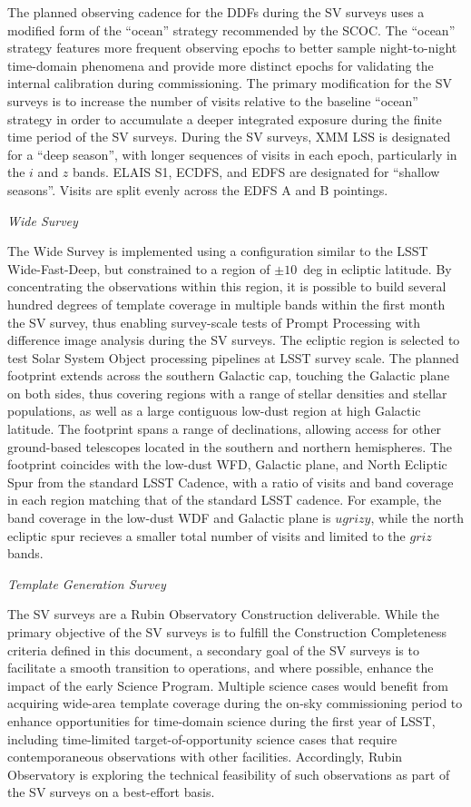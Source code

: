 The planned observing cadence for the DDFs during the SV surveys uses a modified form of the ``ocean'' strategy recommended by the SCOC.
The ``ocean'' strategy features more frequent observing epochs to better sample night-to-night time-domain phenomena and provide more distinct epochs for validating the internal calibration during commissioning.
The primary modification for the SV surveys is to increase the number of visits relative to the baseline ``ocean'' strategy in order to accumulate a deeper integrated exposure during the finite time period of the SV surveys.
During the SV surveys, XMM LSS is designated for a ``deep season'', with longer sequences of visits in each epoch, particularly in the $i$ and $z$ bands.
ELAIS S1, ECDFS, and EDFS are designated for ``shallow seasons''.
Visits are split evenly across the EDFS A and B pointings.

\textit{Wide Survey}

The Wide Survey is implemented using a configuration similar to the LSST Wide-Fast-Deep, but constrained to a region of $\pm10$~deg in ecliptic latitude.
By concentrating the observations within this region, it is possible to build several hundred degrees of template coverage in multiple bands within the first month the SV survey, thus enabling survey-scale tests of Prompt Processing with difference image analysis during the SV surveys.
The ecliptic region is selected to test Solar System Object processing pipelines at LSST survey scale.
The planned footprint extends across the southern Galactic cap, touching the Galactic plane on both sides, thus covering regions with a range of stellar densities and stellar populations, as well as a large contiguous low-dust region at high Galactic latitude.
The footprint spans a range of declinations, allowing access for other ground-based telescopes located in the southern and northern hemispheres.
The footprint coincides with the low-dust WFD, Galactic plane, and North Ecliptic Spur from the standard LSST Cadence, with a ratio of visits and band coverage in each region matching that of the standard LSST cadence.
For example, the band coverage in the low-dust WDF and Galactic plane is $ugrizy$, while the north ecliptic spur recieves a smaller total number of visits and limited to the $griz$ bands.

\textit{Template Generation Survey}

The SV surveys are a Rubin Observatory Construction deliverable.
While the primary objective of the SV surveys is to fulfill the Construction Completeness criteria defined in this document, a secondary goal of the SV surveys is to facilitate a smooth transition to operations, and where possible, enhance the impact of the early Science Program.
Multiple science cases would benefit from acquiring wide-area template coverage during the on-sky commissioning period to enhance opportunities for time-domain science during the first year of LSST, including time-limited target-of-opportunity science cases that require contemporaneous observations with other facilities.
Accordingly, Rubin Observatory is exploring the technical feasibility of such observations as part of the SV surveys on a best-effort basis.

